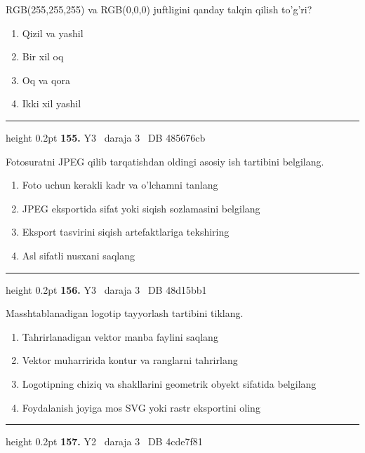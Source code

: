 \documentclass[10pt,a4paper,oneside]{article}
\begin{document}
RGB(255,255,255) va RGB(0,0,0) juftligini qanday talqin qilish to'g'ri?
\begin{enumerate}[label=\Alph*),leftmargin=9mm]
\item Qizil va yashil
\item Bir xil oq
\item Oq va qora
\item Ikki xil yashil
\end{enumerate}
\vspace{2mm}\hrule height 0.2pt \vspace{4mm}
\hypertarget{q155}{\textbf{\color{ink}155.}}  {\color{muted}\scriptsize Y3 \textbullet\ daraja 3 \textbullet\ DB 485676cb}
\par
Fotosuratni JPEG qilib tarqatishdan oldingi asosiy ish tartibini belgilang.
\begin{enumerate}[label=\Alph*),leftmargin=9mm]
\item Foto uchun kerakli kadr va o'lchamni tanlang
\item JPEG eksportida sifat yoki siqish sozlamasini belgilang
\item Eksport tasvirini siqish artefaktlariga tekshiring
\item Asl sifatli nusxani saqlang
\end{enumerate}
\vspace{2mm}\hrule height 0.2pt \vspace{4mm}
\hypertarget{q156}{\textbf{\color{ink}156.}}  {\color{muted}\scriptsize Y3 \textbullet\ daraja 3 \textbullet\ DB 48d15bb1}
\par
Masshtablanadigan logotip tayyorlash tartibini tiklang.
\begin{enumerate}[label=\Alph*),leftmargin=9mm]
\item Tahrirlanadigan vektor manba faylini saqlang
\item Vektor muharririda kontur va ranglarni tahrirlang
\item Logotipning chiziq va shakllarini geometrik obyekt sifatida belgilang
\item Foydalanish joyiga mos SVG yoki rastr eksportini oling
\end{enumerate}
\vspace{2mm}\hrule height 0.2pt \vspace{4mm}
\hypertarget{q157}{\textbf{\color{ink}157.}}  {\color{muted}\scriptsize Y2 \textbullet\ daraja 3 \textbullet\ DB 4cde7f81}
\par
\end{document}
